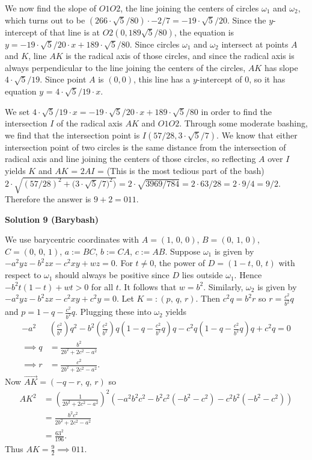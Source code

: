 \begin{enumerate}
 We now find the slope of $O1O2$, the line joining the centers of circles $\omega_1$ and $\omega_2$, which turns out to be ${({266 \cdot \sqrt{5} / 80}) \cdot -2/7} = {-19 \cdot \sqrt{5}/20}$. Since the $y$-intercept of that line is at $O2(0,189\sqrt{5}/80)$, the equation is $y = {{-19 \cdot \sqrt{5}/20} \cdot x} + {189 \cdot \sqrt{5}/80}$.  Since circles $\omega_1$ and $\omega_2$ intersect at points $A$ and $K$, line $AK$ is the radical axis of those circles, and since the radical axis is always perpendicular to the line joining the centers of the circles, $AK$ has slope ${4 \cdot \sqrt{5}/19}$. Since point $A$ is $(0,0)$, this line has a $y$-intercept of $0$, so it has equation $y$ = ${{4 \cdot \sqrt{5}/19} \cdot x}$. 

 We set ${{4 \cdot \sqrt{5}/19} \cdot x} = {{-19 \cdot \sqrt{5}/20} \cdot x} + {189 \cdot \sqrt{5}/80}$ in order to find the intersection $I$ of the radical axis $AK$ and $O1O2$. Through some moderate bashing, we find that the intersection point is $I(57/28, {3 \cdot \sqrt{5}/7})$. We know that either intersection point of two circles is the same distance from the intersection of radical axis and line joining the centers of those circles, so reflecting $A$ over $I$ yields $K$ and $AK$ = $2AI$ = (This is the most tedious part of the bash) ${2 \cdot \sqrt{(57/28)^2 + ({3 \cdot \sqrt{5}/7)^2)}}} = {2 \cdot \sqrt{3969/784}} = {2 \cdot 63/28} = {2 \cdot 9/4} = 9/2$. Therefore the answer is $9 + 2 = \boxed{011}.$




\textbf{Solution 9 (Barybash)}

We use barycentric coordinates with $A=(1,\,0,\,0)$, $B=(0,\,1,\,0)$, $C=(0,\,0,\,1)$, $a:=BC$, $b:=CA$, $c:=AB$. Suppose $\omega_1$ is given by $-a^2yz-b^2zx-c^2xy+wz=0$. For $t\neq 0$, the power of $D=(1-t,\,0,\,t)$ with respect to $\omega_1$ should always be positive since $D$ lies outside $\omega_1$. Hence $-b^2t(1-t)+wt>0$ for all $t$. It follows that $w=b^2$. Similarly, $\omega_2$ is given by $-a^2yz-b^2zx-c^2xy+c^2y=0$. Let $K=:(p,\,q,\,r)$. Then $c^2q=b^2r$ so $r=\frac{c^2}{b^2}q$ and $p=1-q-\frac{c^2}{b^2}q$. Plugging these into $\omega_2$ yields\begin{align*}-a^2&\left(\frac{c^2}{b^2}\right)q^2-b^2\left(\frac{c^2}{b^2}\right)q\left(1-q-\frac{c^2}{b^2}q\right)q-c^2q\left(1-q-\frac{c^2}{b^2}q\right)q+c^2q=0\\\implies q&=\frac{b^2}{2b^2+2c^2-a^2}\\\implies r&=\frac{c^2}{2b^2+2c^2-a^2}.\end{align*}
Now $\overrightarrow{AK}=(-q-r,\,q,\,r)$ so\begin{align*}AK^2&=\left(\frac{1}{2b^2+2c^2-a^2}\right)^2(-a^2b^2c^2-b^2c^2(-b^2-c^2)-c^2b^2(-b^2-c^2))\\&=\frac{b^2c^2}{2b^2+2c^2-a^2}\\&=\frac{63^2}{196}.\end{align*}
Thus $AK=\frac{9}{2}\implies\boxed{011}$.


\end{enumerate}
